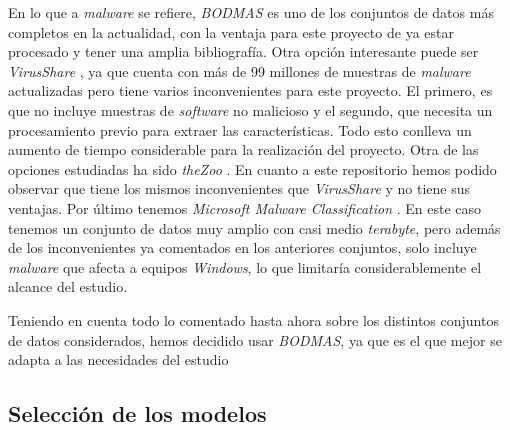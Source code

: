 En lo que a \textit{malware} se refiere, \textit{BODMAS} \cite{bodmas} es uno de los conjuntos de datos más completos en la actualidad, con la ventaja para este proyecto de ya estar procesado y tener una amplia bibliografía. Otra opción interesante puede ser \textit{VirusShare} \cite{virusshare}, ya que cuenta con más de 99 millones de muestras de \textit{malware} actualizadas pero tiene varios inconvenientes para este proyecto. El primero, es que no incluye muestras de \textit{software} no malicioso y el segundo, que necesita un procesamiento previo para extraer las características. Todo esto conlleva un aumento de tiempo considerable para la realización del proyecto. Otra de las opciones estudiadas ha sido \textit{theZoo} \cite{thezoo}. En cuanto a este repositorio hemos podido observar que tiene los mismos inconvenientes que \textit{VirusShare} y no tiene sus ventajas. Por último tenemos \textit{Microsoft Malware Classification} \cite{malware-classification}. En este caso tenemos un conjunto de datos muy amplio con casi medio \textit{terabyte}, pero además de los inconvenientes ya comentados en los anteriores conjuntos, solo incluye \textit{malware} que afecta a equipos \textit{Windows}, lo que limitaría considerablemente el alcance del estudio.

\vspace{1em}

Teniendo en cuenta todo lo comentado hasta ahora sobre los distintos conjuntos de datos considerados, hemos decidido usar \textit{BODMAS}, ya que es el que mejor se adapta a las necesidades del estudio

\subsection{Selección de los modelos}
\label{subsec:select_model}


